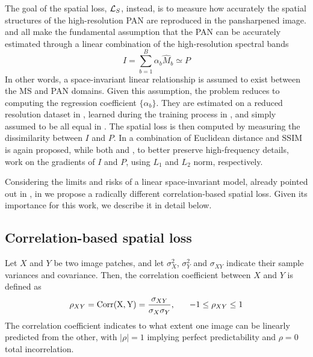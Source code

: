 \documentclass[journal]{IEEEtran}
\newcommand{\hM} {\widehat{M}}
\newcommand{\LL}{{\cal L}}
\begin{document}
The goal of the spatial loss, $\LL_S$, instead,
is to measure how accurately the spatial structures of the high-resolution PAN are reproduced in the pansharpened image.
\cite{Luo2020, Uezato2020} and \cite{Ma2020} all make the fundamental assumption
that the PAN can be accurately estimated through a linear combination of the high-resolution spectral bands
\begin{equation}
    I = \sum_{b=1}^B \alpha_b \hM_b \simeq P
    \label{eq:ms_to_pan}
\end{equation}
In other words, a space-invariant linear relationship is assumed to exist between the MS and PAN domains.
Given this assumption,
the problem reduces to computing the regression coefficient $\{\alpha_b\}$.
They are estimated on a reduced resolution dataset in \cite{Luo2020},
learned during the training process in \cite{Uezato2020}, and simply assumed to be all equal in \cite{Ma2020}.
The spatial loss is then computed by measuring the dissimilarity between $I$ and $P$.
In \cite{Luo2020} a combination of Euclidean distance and SSIM is again proposed,
while both \cite{Uezato2020} and \cite{Ma2020}, to better preserve high-frequency details,
work on the gradients of $I$ and $P$, using $L_1$ and $L_2$ norm, respectively.

Considering the limits and risks of a linear space-invariant model, already pointed out in \cite{Thomas2008},
in \cite{Ciotola2022} we propose a radically different correlation-based spatial loss.
Given its importance for this work, we describe it in detail below.


\subsection{Correlation-based spatial loss}

\newcommand{\wM}{{\widehat{M}}}
Let $X$ and $Y$ be two image patches, and let $\sigma^2_X$, $\sigma^2_Y$ and $\sigma_{XY}$ indicate their sample variances and covariance.
Then, the correlation coefficient between $X$ and $Y$ is defined as
\begin{equation}
    \rho_{XY} = {\rm Corr(X,Y)} = \frac{\sigma_{XY}}{\sigma_X\sigma_Y}, \hspace{6mm} -1 \leq \rho_{XY} \leq 1
    \label{eq:correlation}
\end{equation}
The correlation coefficient indicates to what extent one image can be linearly predicted from the other,
with $|\rho|=1$ implying perfect predictability and $\rho=0$ total incorrelation.
\end{document}
